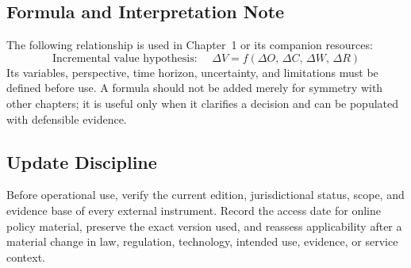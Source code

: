 \subsection{Formula and Interpretation Note}
The following relationship is used in Chapter~1 or its companion resources:
\begin{equation}
\text{Incremental value hypothesis: }\quad \Delta V = f(\Delta O,\,\Delta C,\,\Delta W,\,\Delta R)
\label{eq:comp-ch01-reference-formula}
\end{equation}
Its variables, perspective, time horizon, uncertainty, and limitations must be
defined before use. A formula should not be added merely for symmetry with other
chapters; it is useful only when it clarifies a decision and can be populated with
defensible evidence.

\subsection{Update Discipline}
Before operational use, verify the current edition, jurisdictional status, scope,
and evidence base of every external instrument. Record the access date for online
policy material, preserve the exact version used, and reassess applicability after a
material change in law, regulation, technology, intended use, evidence, or service
context.
